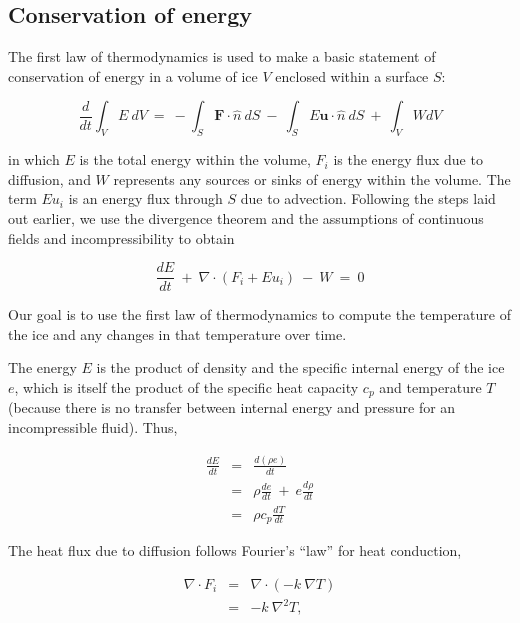 \subsection{Conservation of energy}

The first law of thermodynamics is used to make a basic statement of conservation of energy in a volume of ice $V$ enclosed within a surface $S$:

\begin{equation}
\frac{d}{d t} \int_{V}E ~dV~=~- \int_{S}\mathbf{F}\cdot \hat{n}~dS~-~\int_{S}E \mathbf{u}\cdot \hat{n}~dS~+~\int_{V}W dV
\label{eq:enbal1}
\end{equation}

\noindent
in which $E$ is the total energy within the volume, $F_{i}$ is the energy flux due
to diffusion, and $W$ represents any sources or sinks of energy within
the volume. The term $Eu_{i}$ is an energy flux through $S$ due to advection.
Following the steps laid out earlier, we use the divergence theorem and
the assumptions of continuous fields and incompressibility to obtain

\begin{equation}
\frac{dE}{dt}~+~\nabla \cdot \left(F_{i} +E u_{i}  \right)~-~W~=~0
\label{eq:enbal2}
\end{equation}

\noindent
Our goal is to use the first law of thermodynamics to compute the temperature of the ice and any changes in that temperature over time.

The energy $E$ is the product of density and the specific internal
energy of the ice $e$, which is itself the product of the specific heat
capacity $c_{p}$ and temperature $T$ (because there is no transfer
between internal energy and pressure for an incompressible fluid). Thus,

\begin{equation}
\begin{matrix}
\frac{dE}{dt}&=&\frac{d\left(\rho e \right)}{dt} \\
&=&\rho\frac{de}{dt}~+~e \frac{d\rho}{dt}\\
&=&\rho c_{p} \frac{dT}{dt}
\end{matrix}
\label{eq:enbal3}
\end{equation}

\noindent
The heat flux due to diffusion follows Fourier's ``law'' for heat conduction,

\begin{equation}
\begin{matrix}
\nabla \cdot F_{i}&=&\nabla \cdot \left( -k ~\nabla T  \right) \\
&=&-k~\nabla^{2}T,
\end{matrix}
\label{eq:enbal4}
\end{equation}


